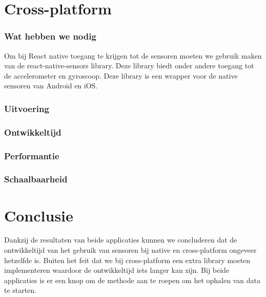 


\section{Cross-platform}
\subsubsection{Wat hebben we nodig}
Om bij React native toegang te krijgen tot de sensoren moeten we gebruik maken van de react-native-sensors library.
Deze library biedt onder andere toegang tot de accelerometer en gyroscoop. Deze library is een wrapper voor de
native sensoren van Android en iOS. 

\subsubsection{Uitvoering}



\subsubsection{Ontwikkeltijd}



\subsubsection{Performantie}



\subsubsection{Schaalbaarheid}




\section{Conclusie}
Dankzij de resultaten van beide applicaties kunnen we concluderen dat de ontwikkeltijd van het gebruik van sensoren
bij native en cross-platform ongeveer hetzelfde is. Buiten het feit dat we bij cross-platform een extra library moeten
implementeren waardoor de ontwikkeltijd iets langer kan zijn. Bij beide applicaties is er een knop om de methode aan 
te roepen om het ophalen van data te starten.

